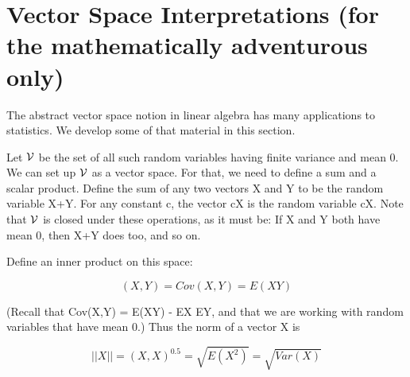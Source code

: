 % 
% 


\section{Vector Space Interpretations (for the mathematically
adventurous only)}
\label{adventure}

The abstract vector space notion in linear algebra has many applications
to statistics.  We develop some of that material in this section.


Let $\cal V$ be the set of all such random variables having finite
variance and mean 0.  We can set up $\cal V$ as a vector space.  For that,
we need to define a sum and a scalar product.  Define the sum of any two
vectors X and Y to be the random variable X+Y.  For any constant c, the
vector cX is the random variable cX.  Note that $\cal V$ is closed under
these operations, as it must be:  If X and Y both have mean 0, then X+Y
does too, and so on.

Define an inner product on this space:

\begin{equation}
(X,Y) = Cov(X,Y) = E(XY) 
\end{equation}

(Recall that Cov(X,Y) = E(XY) - EX EY, and that we are working with
random variables that have mean 0.) Thus the norm of a vector X is

\begin{equation}
||X|| = {(X,X)}^{0.5} = \sqrt{E(X^2)} = \sqrt{Var(X)}
\end{equation}

